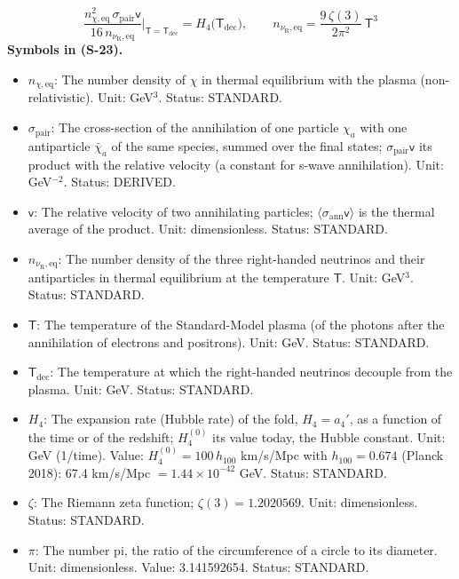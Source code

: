 \documentclass[
  10pt,
]{article}
\providecommand{\tightlist}{%
  \setlength{\itemsep}{0pt}\setlength{\parskip}{0pt}}
\begin{document}
\[
\frac{n_{\chi,\mathrm{eq}}^2\,\sigma_{\mathrm{pair}}\mathsf{v}}{16\,n_{\nu_{\mathrm{R}},\mathrm{eq}}}\Big\vert_{\mathsf{T} = \mathsf{T}_{\mathrm{dec}}}
= H_4\big(\mathsf{T}_{\mathrm{dec}}\big),\qquad n_{\nu_{\mathrm{R}},\mathrm{eq}} = \frac{9\,\zeta(3)}{2\pi^2}\,\mathsf{T}^3 \tag{S-23}
\] \textbf{Symbols in (S-23).}

\begin{itemize}
\tightlist
\item
  \(n_{\chi,\mathrm{eq}}\): The number density of \(\chi\) in thermal
  equilibrium with the plasma (non-relativistic). Unit: GeV\(^3\).
  Status: STANDARD.
\item
  \(\sigma_{\mathrm{pair}}\): The cross-section of the annihilation of
  one particle \(\chi_a\) with one antiparticle \(\bar\chi_a\) of the
  same species, summed over the final states;
  \(\sigma_{\mathrm{pair}}\mathsf{v}\) its product with the relative
  velocity (a constant for s-wave annihilation). Unit: GeV\(^{-2}\).
  Status: DERIVED.
\item
  \(\mathsf{v}\): The relative velocity of two annihilating particles;
  \(\langle\sigma_{\mathrm{ann}}\mathsf{v}\rangle\) is the thermal
  average of the product. Unit: dimensionless. Status: STANDARD.
\item
  \(n_{\nu_{\mathrm{R}},\mathrm{eq}}\): The number density of the three
  right-handed neutrinos and their antiparticles in thermal equilibrium
  at the temperature \(\mathsf{T}\). Unit: GeV\(^3\). Status: STANDARD.
\item
  \(\mathsf{T}\): The temperature of the Standard-Model plasma (of the
  photons after the annihilation of electrons and positrons). Unit: GeV.
  Status: STANDARD.
\item
  \(\mathsf{T}_{\mathrm{dec}}\): The temperature at which the
  right-handed neutrinos decouple from the plasma. Unit: GeV. Status:
  STANDARD.
\item
  \(H_4\): The expansion rate (Hubble rate) of the fold, \(H_4 = a_4'\),
  as a function of the time or of the redshift; \(H_4^{(0)}\) its value
  today, the Hubble constant. Unit: GeV (1/time). Value:
  \(H_4^{(0)} = 100\,h_{100}\) km/s/Mpc with \(h_{100} = 0.674\) (Planck
  2018): 67.4 km/s/Mpc \(= 1.44\times10^{-42}\) GeV. Status: STANDARD.
\item
  \(\zeta\): The Riemann zeta function; \(\zeta(3) = 1.2020569\). Unit:
  dimensionless. Status: STANDARD.
\item
  \(\pi\): The number pi, the ratio of the circumference of a circle to
  its diameter. Unit: dimensionless. Value: 3.141592654. Status:
  STANDARD.
\end{itemize}
\end{document}

